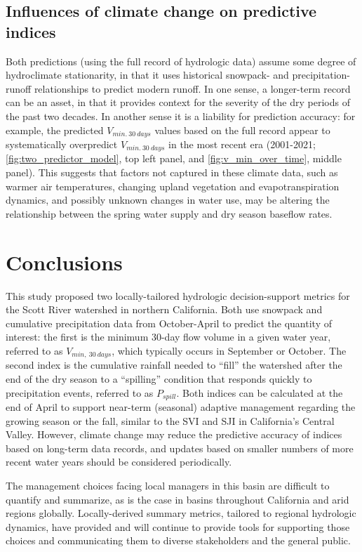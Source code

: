 \documentclass[hess, manuscript]{copernicus}
\begin{document}
\subsection{Influences of climate change on predictive indices}

Both predictions (using the full record of hydrologic data) assume some
degree of hydroclimate stationarity, in that it uses historical
snowpack- and precipitation-runoff relationships to predict modern
runoff. In one sense, a longer-term record can be an asset, in that it
provides context for the severity of the dry periods of the past two
decades. In another sense it is a liability for prediction accuracy: for
example, the predicted \(V_{min.~30~days}\) values based on the full
record appear to systematically overpredict \(V_{min.~30~days}\) in the
most recent era (2001-2021; \autoref{fig:two_predictor_model}, top left
panel, and \autoref{fig:v_min_over_time}, middle panel). This suggests
that factors not captured in these climate data, such as warmer air
temperatures, changing upland vegetation and evapotranspiration
dynamics, and possibly unknown changes in water use, may be altering the
relationship between the spring water supply and dry season baseflow
rates.

\section{Conclusions}

This study proposed two locally-tailored hydrologic decision-support
metrics for the Scott River watershed in northern California. Both use
snowpack and cumulative precipitation data from October-April to predict
the quantity of interest: the first is the minimum 30-day flow volume in
a given water year, referred to as \(V_{min,~30~days}\), which typically
occurs in September or October. The second index is the cumulative
rainfall needed to ``fill'' the watershed after the end of the dry
season to a ``spilling'' condition that responds quickly to
precipitation events, referred to as \(P_{spill}\). Both indices can be
calculated at the end of April to support near-term (seasonal) adaptive
management regarding the growing season or the fall, similar to the SVI
and SJI in California's Central Valley. However, climate change may
reduce the predictive accuracy of indices based on long-term data
records, and updates based on smaller numbers of more recent water years
should be considered periodically.

The management choices facing local managers in this basin are difficult
to quantify and summarize, as is the case in basins throughout
California and arid regions globally. Locally-derived summary metrics,
tailored to regional hydrologic dynamics, have provided and will
continue to provide tools for supporting those choices and communicating
them to diverse stakeholders and the general public.
\end{document}
